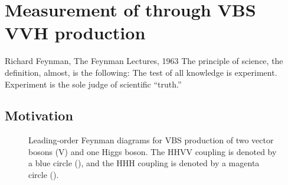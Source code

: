 \chapter{Measurement of \kVV through VBS VVH production}
\begin{aquote}{Richard Feynman, The Feynman Lectures, 1963}
The principle of science, the definition, almost, is the following: The test of all knowledge is experiment. 
Experiment is the sole judge of scientific ``truth.''
\end{aquote}

\section{Motivation}
\begin{figure}[htb]
    \centering
    \quad
    \quad
    \caption{
        Leading-order Feynman diagrams for VBS production of two vector bosons (V) and one Higgs boson. 
        The HHVV coupling \kVV is denoted by a blue circle (\textcolor{blue}{}), and the HHH coupling \kHHH is denoted by a magenta circle (\textcolor{magenta}{}). 
    }
    \label{fig:vbsvvh_feynman}
\end{figure}

